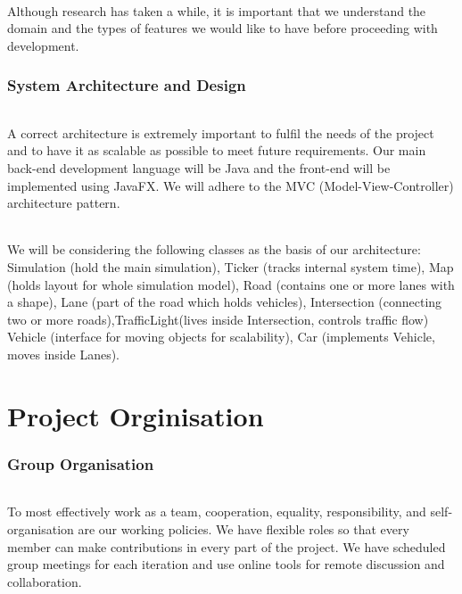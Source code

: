 \documentclass[11pt, a4]{article}
\begin{document}
\paragraph{}
Although research has taken a while, it is important that we understand the domain and the types of features we would like to have before proceeding with development.

\section{System Architecture and Design}\label{arch:desgn}
\paragraph{}
A correct architecture is extremely important to fulfil the needs of the project and to have it as scalable as possible to meet future requirements. Our main back-end development language will be Java and the front-end will be implemented using JavaFX. We will adhere to the MVC (Model-View-Controller) architecture pattern.
\paragraph{}
We will be considering the following classes as the basis of our architecture: Simulation (hold the main simulation), Ticker (tracks internal system time), Map (holds layout for whole simulation model), Road (contains one or more lanes with a shape), Lane (part of the road which holds vehicles), Intersection (connecting two or more roads),TrafficLight(lives inside Intersection, controls traffic flow) Vehicle (interface for moving objects for
scalability), Car (implements Vehicle, moves inside Lanes).

\part*{Project Orginisation}
\section{Group Organisation}\label{proj:org}
\paragraph{}
To most effectively work as a team, cooperation, equality, responsibility, and self-organisation are our working policies. We have flexible roles so that every member can make contributions in every part of the project. We have scheduled group meetings for each iteration and use online tools for remote discussion and collaboration.
\end{document}
